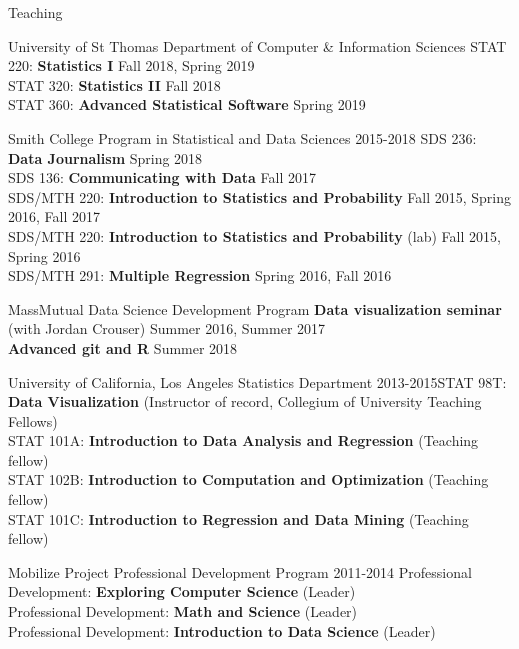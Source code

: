 \documentclass{resume} %
\begin{document}
\begin{rSection}{Teaching}

\begin{reSubsection}{University of St Thomas }{Department of Computer \& Information Sciences }{}{
STAT 220: \textbf{Statistics I} \hfill Fall 2018, Spring 2019 \\
STAT 320: \textbf{Statistics II} \hfill Fall 2018 \\
STAT 360: \textbf{Advanced Statistical Software} \hfill Spring 2019\\}
\end{reSubsection}

\begin{reSubsection}{Smith College }{ Program in Statistical and Data Sciences }{2015-2018}{
SDS 236: \textbf{Data Journalism} \hfill Spring 2018 \\
SDS 136: \textbf{Communicating with Data} \hfill Fall 2017 \\
SDS/MTH 220: \textbf{Introduction to Statistics and Probability}  \hfill Fall 2015, Spring 2016, Fall 2017 \\
SDS/MTH 220: \textbf{Introduction to Statistics and Probability} (lab) \hfill Fall 2015, Spring 2016 \\
SDS/MTH 291: \textbf{Multiple Regression} \hfill Spring 2016, Fall 2016\\}
\end{reSubsection}

\begin{reSubsection}{MassMutual }{ Data Science Development Program }{}{
\textbf{Data visualization seminar} (with Jordan Crouser) \hfill Summer 2016, Summer 2017\\
\textbf{Advanced git and R} \hfill Summer 2018 \\}
\end{reSubsection}

\begin{reSubsection}{University of California, Los Angeles }{ Statistics Department }{2013-2015}{STAT 98T: \textbf{Data Visualization }(Instructor of record, Collegium of University Teaching Fellows) \\
STAT 101A: \textbf{Introduction to Data Analysis and Regression} (Teaching fellow) \\
STAT 102B: \textbf{Introduction to Computation and Optimization} (Teaching fellow) \\
STAT 101C: \textbf{Introduction to Regression and Data Mining} (Teaching fellow) \\
}
\end{reSubsection}

\begin{reSubsection}{Mobilize Project }{ Professional Development Program }{2011-2014}{
 Professional Development: \textbf{Exploring Computer Science} (Leader) \\
 Professional Development: \textbf{Math and Science} (Leader) \\
Professional Development: \textbf{Introduction to Data Science} (Leader) \\
}
\end{reSubsection}
\end{rSection}
\end{document}
